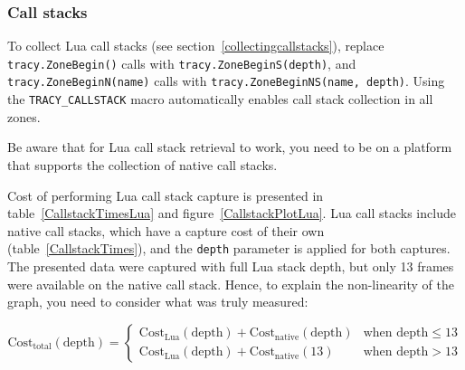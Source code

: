 \documentclass[hidelinks,titlepage,a4paper]{article}
\begin{document}
\subsubsection{Call stacks}

To collect Lua call stacks (see section~\ref{collectingcallstacks}), replace \texttt{tracy.ZoneBegin()} calls with \texttt{tracy.ZoneBeginS(depth)}, and \texttt{tracy.ZoneBeginN(name)} calls with \texttt{tracy.ZoneBeginNS(name, depth)}. Using the \texttt{TRACY\_CALLSTACK} macro automatically enables call stack collection in all zones.

Be aware that for Lua call stack retrieval to work, you need to be on a platform that supports the collection of native call stacks.

Cost of performing Lua call stack capture is presented in table~\ref{CallstackTimesLua} and figure~\ref{CallstackPlotLua}. Lua call stacks include native call stacks, which have a capture cost of their own (table~\ref{CallstackTimes}), and the \texttt{depth} parameter is applied for both captures. The presented data were captured with full Lua stack depth, but only 13 frames were available on the native call stack. Hence, to explain the non-linearity of the graph, you need to consider what was truly measured:

\begin{displaymath}
\text{Cost}_{\text{total}}(\text{depth}) =
\begin{cases}
\text{Cost}_{\text{Lua}}(\text{depth}) + \text{Cost}_{\text{native}}(\text{depth}) & \text{when depth} \leq 13 \\
\text{Cost}_{\text{Lua}}(\text{depth}) + \text{Cost}_{\text{native}}(13) & \text{when depth} > 13
\end{cases}
\end{displaymath}
\end{document}
